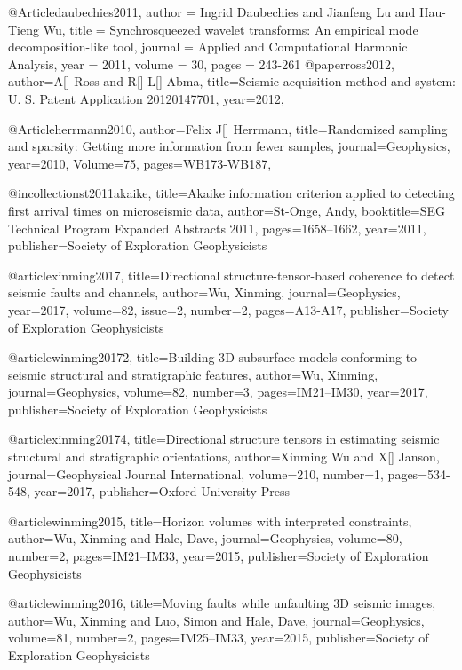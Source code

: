 @Article{daubechies2011,
  author = 	 {Ingrid Daubechies and Jianfeng Lu and Hau-Tieng Wu},
  title = 	 {Synchrosqueezed wavelet transforms: An empirical mode decomposition-like tool},
  journal = 	 {Applied and Computational Harmonic Analysis},
  year = 	 2011,
  volume = 	 30,
  pages = 	 {243-261}
}
@paper{ross2012,
  author={A[] Ross and R[] L[] Abma},
  title={Seismic acquisition method and system: U. S. Patent Application
20120147701},
  year=2012,
}

@Article{herrmann2010,
  author={Felix J[] Herrmann},
  title={Randomized sampling and sparsity: Getting more information from fewer samples},
  journal={Geophysics},
  year=2010,
  Volume=75,
  pages={WB173-WB187},
}

@incollection{st2011akaike,
  title={Akaike information criterion applied to detecting first arrival times on microseismic data},
  author={St-Onge, Andy},
  booktitle={SEG Technical Program Expanded Abstracts 2011},
  pages={1658--1662},
  year={2011},
  publisher={Society of Exploration Geophysicists}
}

@article{xinming2017,
  title={Directional structure-tensor-based coherence to detect seismic faults and channels},
  author={Wu, Xinming},
  journal={Geophysics},
  year={2017},
  volume=82,
  issue=2,
  number=2,
  pages={A13-A17},
  publisher={Society of Exploration Geophysicists}
}

@article{winming20172,
  title={Building 3{D} subsurface models conforming to seismic structural and stratigraphic features},
  author={Wu, Xinming},
  journal={Geophysics},
  volume={82},
  number={3},
  pages={IM21--IM30},
  year={2017},
  publisher={Society of Exploration Geophysicists}
}

@article{xinming20174,
  title={Directional structure tensors in estimating seismic structural and stratigraphic orientations},
  author={Xinming Wu and X[] Janson},
  journal={Geophysical Journal International},
  volume={210},
  number={1},
  pages={534-548},
  year={2017},
  publisher={Oxford University Press}
}

@article{winming2015,
  title={Horizon volumes with interpreted constraints},
  author={Wu, Xinming and Hale, Dave},
  journal={Geophysics},
  volume={80},
  number={2},
  pages={IM21--IM33},
  year={2015},
  publisher={Society of Exploration Geophysicists}
}

@article{winming2016,
  title={Moving faults while unfaulting 3D seismic images},
  author={Wu, Xinming and Luo, Simon and Hale, Dave},
  journal={Geophysics},
  volume={81},
  number={2},
  pages={IM25--IM33},
  year={2015},
  publisher={Society of Exploration Geophysicists}
}


